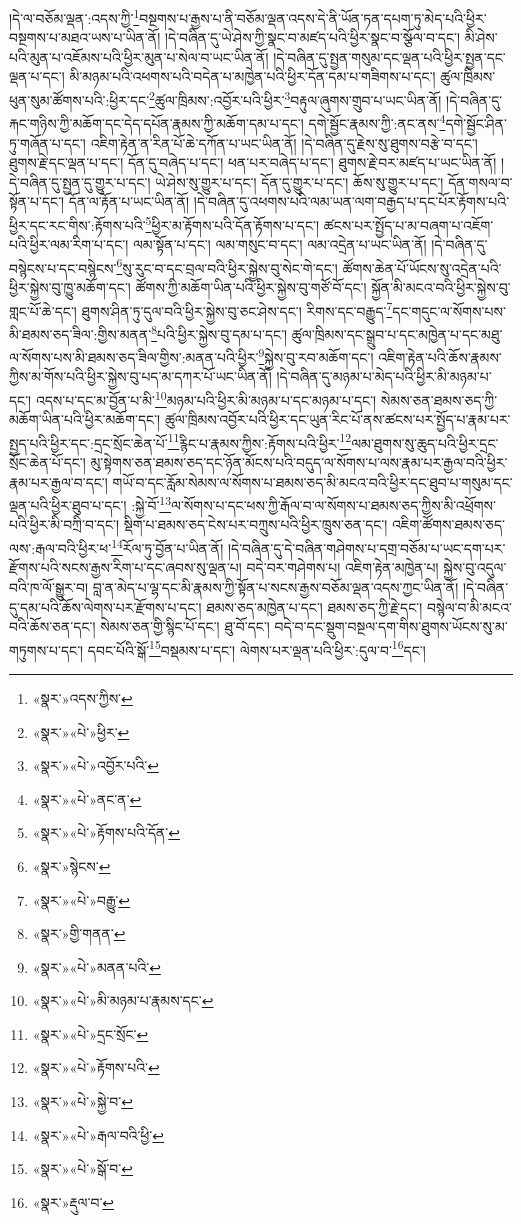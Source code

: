།དེ་ལ་བཅོམ་ལྡན་:འདས་ཀྱི་\footnote{«སྣར་»འདས་ཀྱིས་}བསྔགས་པ་རྒྱས་པ་ནི་བཅོམ་ལྡན་འདས་དེ་ནི་ཡོན་ཏན་དཔག་ཏུ་མེད་པའི་ཕྱིར་བསྔགས་པ་མཐའ་ཡས་པ་ཡིན་ནོ། །དེ་བཞིན་དུ་ཡེ་ཤེས་ཀྱི་སྣང་བ་མཛད་པའི་ཕྱིར་སྣང་བ་སྩོལ་བ་དང་། མི་ཤེས་པའི་མུན་པ་འཇོམས་པའི་ཕྱིར་མུན་པ་སེལ་བ་ཡང་ཡིན་ནོ། །དེ་བཞིན་དུ་སྤྱན་གསུམ་དང་ལྡན་པའི་ཕྱིར་སྤྱན་དང་ལྡན་པ་དང་། མི་མཉམ་པའི་འཕགས་པའི་བདེན་པ་མཁྱེན་པའི་ཕྱིར་དོན་དམ་པ་གཟིགས་པ་དང་། ཚུལ་ཁྲིམས་ཕུན་སུམ་ཚོགས་པའི་:ཕྱིར་དང་\footnote{«སྣར་»«པེ་»ཕྱིར་}ཚུལ་ཁྲིམས་:འབྱོར་པའི་ཕྱིར་\footnote{«སྣར་»«པེ་»འབྱོར་པའི་}བརྟུལ་ཞུགས་གྲུབ་པ་ཡང་ཡིན་ནོ། །དེ་བཞིན་དུ་རྐང་གཉིས་ཀྱི་མཆོག་དང་དེད་དཔོན་རྣམས་ཀྱི་མཆོག་དམ་པ་དང་། དགེ་སྦྱོང་རྣམས་ཀྱི་:ནང་ནས་\footnote{«སྣར་»«པེ་»ནང་ན་}དགེ་སྦྱོང་ཤིན་ཏུ་གཞོན་པ་དང་། འཇིག་རྟེན་ན་རིན་པོ་ཆེ་དཀོན་པ་ཡང་ཡིན་ནོ། །དེ་བཞིན་དུ་རྗེས་སུ་ཐུགས་བརྩེ་བ་དང་། ཐུགས་རྗེ་དང་ལྡན་པ་དང་། དོན་དུ་བཞེད་པ་དང་། ཕན་པར་བཞེད་པ་དང་། ཐུགས་རྗེ་བར་མཛད་པ་ཡང་ཡིན་ནོ། །དེ་བཞིན་དུ་སྤྱན་དུ་གྱུར་པ་དང་། ཡེ་ཤེས་སུ་གྱུར་པ་དང་། དོན་དུ་གྱུར་པ་དང་། ཆོས་སུ་གྱུར་པ་དང་། དོན་གསལ་བ་སྟོན་པ་དང་། དོན་ལ་རྟོན་པ་ཡང་ཡིན་ནོ། །དེ་བཞིན་དུ་འཕགས་པའི་ལམ་ཡན་ལག་བརྒྱད་པ་དང་པོར་རྟོགས་པའི་ཕྱིར་དང་རང་གིས་:རྟོགས་པའི་\footnote{«སྣར་»«པེ་»རྟོགས་པའི་དོན་}ཕྱིར་མ་རྟོགས་པའི་དོན་རྟོགས་པ་དང་། ཚངས་པར་སྤྱོད་པ་མ་བཞག་པ་འཇོག་པའི་ཕྱིར་ལམ་རིག་པ་དང་། ལམ་སྟོན་པ་དང་། ལམ་གསུང་བ་དང་། ལམ་འདྲེན་པ་ཡང་ཡིན་ནོ། །དེ་བཞིན་དུ་བསྙེངས་པ་དང་བསྙེངས་\footnote{«སྣར་»སྙེངས་}སུ་རུང་བ་དང་བྲལ་བའི་ཕྱིར་སྐྱེས་བུ་སེང་གེ་དང་། ཚོགས་ཆེན་པོ་ཡོངས་སུ་འདྲེན་པའི་ཕྱིར་སྐྱེས་བུ་ཁྱུ་མཆོག་དང་། ཚོགས་ཀྱི་མཆོག་ཡིན་པའི་ཕྱིར་སྐྱེས་བུ་གཙོ་བོ་དང་། སྐྱོན་མི་མངའ་བའི་ཕྱིར་སྐྱེས་བུ་གླང་པོ་ཆེ་དང་། ཐུགས་ཤིན་ཏུ་དུལ་བའི་ཕྱིར་སྐྱེས་བུ་ཅང་ཤེས་དང་། རིགས་དང་བརྒྱུད་\footnote{«སྣར་»«པེ་»བརྒྱུ་}དང་གདུང་ལ་སོགས་པས་མི་ཐམས་ཅད་ཟིལ་:གྱིས་མནན་\footnote{«སྣར་»གྱི་གནན་}པའི་ཕྱིར་སྐྱེས་བུ་དམ་པ་དང་། ཚུལ་ཁྲིམས་དང་སྒྲུབ་པ་དང་མཁྱེན་པ་དང་མཐུ་ལ་སོགས་པས་མི་ཐམས་ཅད་ཟིལ་གྱིས་:མནན་པའི་ཕྱིར་\footnote{«སྣར་»«པེ་»མནན་པའི་}སྐྱེས་བུ་རབ་མཆོག་དང་། འཇིག་རྟེན་པའི་ཆོས་རྣམས་ཀྱིས་མ་གོས་པའི་ཕྱིར་སྐྱེས་བུ་པད་མ་དཀར་པོ་ཡང་ཡིན་ནོ། །དེ་བཞིན་དུ་མཉམ་པ་མེད་པའི་ཕྱིར་མི་མཉམ་པ་དང་། འདས་པ་དང་མ་བྱོན་པ་མི་\footnote{«སྣར་»«པེ་»མི་མཉམ་པ་རྣམས་དང་}མཉམ་པའི་ཕྱིར་མི་མཉམ་པ་དང་མཉམ་པ་དང་། སེམས་ཅན་ཐམས་ཅད་ཀྱི་མཆོག་ཡིན་པའི་ཕྱིར་མཆོག་དང་། ཚུལ་ཁྲིམས་འབྱོར་པའི་ཕྱིར་དང་ཡུན་རིང་པོ་ནས་ཚངས་པར་སྤྱོད་པ་རྣམ་པར་སྤྱད་པའི་ཕྱིར་དང་:དྲང་སྲོང་ཆེན་པོ་\footnote{«སྣར་»«པེ་»དྲང་སྲོང་}རྙིང་པ་རྣམས་ཀྱིས་:རྟོགས་པའི་ཕྱིར་\footnote{«སྣར་»«པེ་»རྟོགས་པའི་}ལམ་ཐུགས་སུ་ཆུད་པའི་ཕྱིར་དྲང་སྲོང་ཆེན་པོ་དང་། མུ་སྟེགས་ཅན་ཐམས་ཅད་དང་ཉོན་མོངས་པའི་བདུད་ལ་སོགས་པ་ལས་རྣམ་པར་རྒྱལ་བའི་ཕྱིར་རྣམ་པར་རྒྱལ་བ་དང་། གཡོ་བ་དང་རློམ་སེམས་ལ་སོགས་པ་ཐམས་ཅད་མི་མངའ་བའི་ཕྱིར་དང་ཐུབ་པ་གསུམ་དང་ལྡན་པའི་ཕྱིར་ཐུབ་པ་དང་། :སྐྱེ་བོ་\footnote{«སྣར་»«པེ་»སྐྱེ་བ་}ལ་སོགས་པ་དང་ཕས་ཀྱི་རྒོལ་བ་ལ་སོགས་པ་ཐམས་ཅད་ཀྱིས་མི་འཕྲོགས་པའི་ཕྱིར་མི་བཀྲི་བ་དང་། སྡིག་པ་ཐམས་ཅད་ངེས་པར་བཀྲུས་པའི་ཕྱིར་ཁྲུས་ཅན་དང་། འཇིག་ཚོགས་ཐམས་ཅད་ལས་:རྒལ་བའི་ཕྱིར་ཕ་\footnote{«སྣར་»«པེ་»རྒལ་བའི་ཕྱི་}རོལ་ཏུ་བྱོན་པ་ཡིན་ནོ། །དེ་བཞིན་དུ་དེ་བཞིན་གཤེགས་པ་དགྲ་བཅོམ་པ་ཡང་དག་པར་རྫོགས་པའི་སངས་རྒྱས་རིག་པ་དང་ཞབས་སུ་ལྡན་པ། བདེ་བར་གཤེགས་པ། འཇིག་རྟེན་མཁྱེན་པ། སྐྱེས་བུ་འདུལ་བའི་ཁ་ལོ་སྒྱུར་བ། བླ་ན་མེད་པ་ལྷ་དང་མི་རྣམས་ཀྱི་སྟོན་པ་སངས་རྒྱས་བཅོམ་ལྡན་འདས་ཀྱང་ཡིན་ནོ། །དེ་བཞིན་དུ་དམ་པའི་ཆོས་ལེགས་པར་རྫོགས་པ་དང་། ཐམས་ཅད་མཁྱེན་པ་དང་། ཐམས་ཅད་ཀྱི་རྗེ་དང་། བསྙེལ་བ་མི་མངའ་བའི་ཆོས་ཅན་དང་། སེམས་ཅན་གྱི་སྙིང་པོ་དང་། ཐུ་བོ་དང་། བདེ་བ་དང་སྡུག་བསྔལ་དག་གིས་ཐུགས་ཡོངས་སུ་མ་གཏུགས་པ་དང་། དབང་པོའི་སྒོ་\footnote{«སྣར་»«པེ་»སྒོ་བ་}བསྡམས་པ་དང་། ལེགས་པར་ལྡན་པའི་ཕྱིར་:དུལ་བ་\footnote{«སྣར་»རྡུལ་བ་}དང་། 